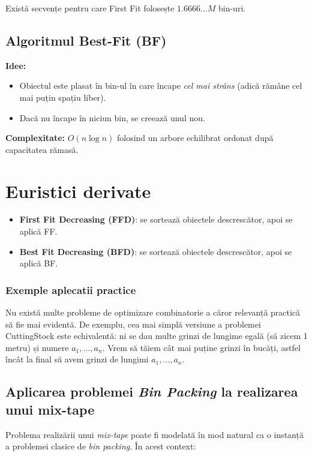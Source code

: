 \documentclass[runningheads]{llncs}
\begin{document}
	Există secvențe pentru care First Fit folosește $1.6666\ldots M$ bin-uri.

	\subsection{Algoritmul Best-Fit (BF)}

	\textbf{Idee:}
	\begin{itemize}
		\item Obiectul este plasat în bin-ul în care încape \emph{cel mai strâns} (adică rămâne cel mai puțin spațiu liber).
		\item Dacă nu încape în niciun bin, se creează unul nou.
	\end{itemize}

	\textbf{Complexitate:} $O(n \log n)$ folosind un arbore echilibrat ordonat după capacitatea rămasă.

	\section{Euristici derivate}

	\begin{itemize}
		\item \textbf{First Fit Decreasing (FFD)}: se sortează obiectele descrescător, apoi se aplică FF.
		\item \textbf{Best Fit Decreasing (BFD)}: se sortează obiectele descrescător, apoi se aplică BF.
	\end{itemize}

	\subsubsection{Exemple aplecatii practice}
	Nu există multe probleme de optimizare combinatorie a căror relevanță practică să fie mai evidentă. De exemplu, cea mai simplă versiune a problemei CuttingStock
	este echivalentă: ni se dau multe grinzi de lungime egală (să zicem 1 metru) și numere $a_1, ... ,a_n.$ Vrem să tăiem cât mai puține grinzi în bucăți, astfel încât la final să avem grinzi de lungimi $a_1, ... , a_n.$

	\subsection{Aplicarea problemei \textit{Bin Packing} la realizarea unui mix-tape}

	Problema realizării unui \emph{mix-tape} poate fi modelată în mod natural ca o instanță a problemei clasice de \textit{bin packing}.
	În acest context:
\end{document}
